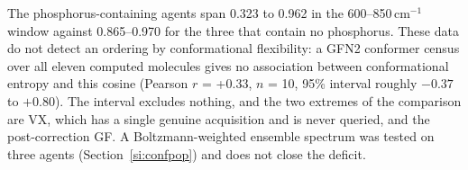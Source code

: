 \documentclass[11pt]{article}
\newcommand*\wn{\ensuremath{\text{cm}^{-1}}}
\begin{document}
\begin{table}[htbp]
\centering
\caption{Measured-to-computed cosine by region for every queried agent. Bold entries are the 600--850\,\wn{} window of the phosphorus-containing agents.}
\label{tab:si-regbyagent}
\footnotesize
{}

\begin{flushleft}\footnotesize The phosphorus-containing agents span 0.323 to 0.962 in the 600--850\,\wn{} window against 0.865--0.970 for the three that contain no phosphorus. These data do not detect an ordering by conformational flexibility: a GFN2 conformer census over all eleven computed molecules gives no association between conformational entropy and this cosine (Pearson $r$ = +0.33, $n$ = 10, 95\% interval roughly $-0.37$ to $+0.80$). The interval excludes nothing, and the two extremes of the comparison are VX, which has a single genuine acquisition and is never queried, and the post-correction GF. A Boltzmann-weighted ensemble spectrum was tested on three agents (Section~\ref{si:confpop}) and does not close the deficit.\end{flushleft}
\end{table}
\clearpage
\end{document}
